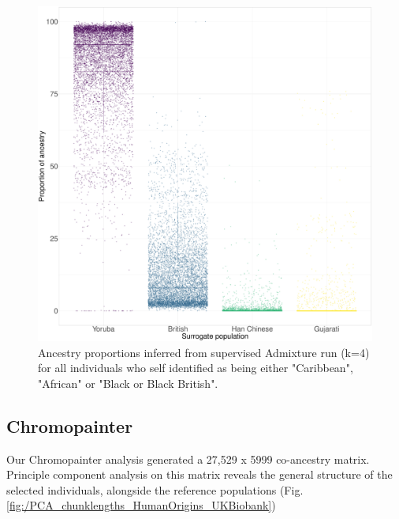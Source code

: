 \begin{figure}[htp]
    \centering
    \includegraphics[width=1.0\textwidth]{../images/chapter3/African_Inds_proportions.pdf}
    \caption{Ancestry proportions inferred from supervised Admixture run (k=4) for all individuals who self identified as being either "Caribbean", "African" or "Black or Black British".}
    \label{fig:African_Inds_proportions_ADMIXTURE}
\end{figure}


\subsection{Chromopainter}

Our Chromopainter analysis generated a 27,529 x 5999 co-ancestry matrix. Principle component analysis on this matrix reveals the general structure of the selected individuals, alongside the reference populations (Fig. \ref{fig:/PCA_chunklengths_HumanOrigins_UKBiobank})


